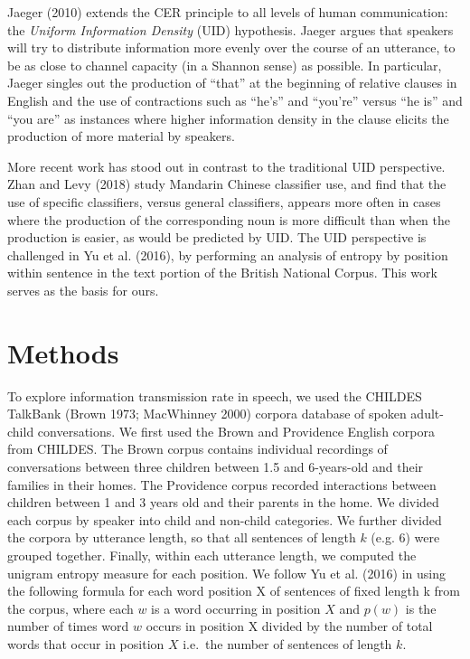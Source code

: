 \documentclass[10pt, letterpaper]{article}
\begin{document}
Jaeger (2010) extends the CER principle to all levels of human
communication: the \emph{Uniform Information Density} (UID) hypothesis.
Jaeger argues that speakers will try to distribute information more
evenly over the course of an utterance, to be as close to channel
capacity (in a Shannon sense) as possible. In particular, Jaeger singles
out the production of ``that'' at the beginning of relative clauses in
English and the use of contractions such as ``he's'' and ``you're''
versus ``he is'' and ``you are'' as instances where higher information
density in the clause elicits the production of more material by
speakers.

More recent work has stood out in contrast to the traditional UID
perspective. Zhan and Levy (2018) study Mandarin Chinese classifier use,
and find that the use of specific classifiers, versus general
classifiers, appears more often in cases where the production of the
corresponding noun is more difficult than when the production is easier,
as would be predicted by UID. The UID perspective is challenged in Yu et
al. (2016), by performing an analysis of entropy by position within
sentence in the text portion of the British National Corpus. This work
serves as the basis for ours.

\section{Methods}\label{methods}

To explore information transmission rate in speech, we used the CHILDES
TalkBank (Brown 1973; MacWhinney 2000) corpora database of spoken
adult-child conversations. We first used the Brown and Providence
English corpora from CHILDES. The Brown corpus contains individual
recordings of conversations between three children between 1.5 and
6-years-old and their families in their homes. The Providence corpus
recorded interactions between children between 1 and 3 years old and
their parents in the home. We divided each corpus by speaker into child
and non-child categories. We further divided the corpora by utterance
length, so that all sentences of length \(k\) (e.g. \(6\)) were grouped
together. Finally, within each utterance length, we computed the unigram
entropy measure for each position. We follow Yu et al. (2016) in using
the following formula for each word position X of sentences of fixed
length k from the corpus, where each \(w\) is a word occurring in
position \(X\) and \(p(w)\) is the number of times word \(w\) occurs in
position X divided by the number of total words that occur in position
\(X\) i.e.~the number of sentences of length \(k\).
\end{document}
